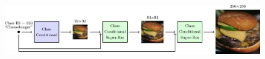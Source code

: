 \begin{description}
\begin{description}
            \begin{figure}[H]
                \centering
                \includegraphics[width=0.9\linewidth]{./img/cascaded_diffusion_models.jpg}
            \end{figure}
        \end{description}
\end{description}



\let\x\undefined
\let\params\undefined